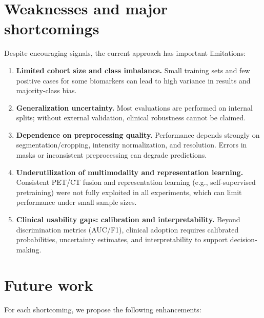 \documentclass[twoside,runningheads,a4paper,11pt]{report}
\begin{document}
\section{Weaknesses and major shortcomings}
Despite encouraging signals, the current approach has important limitations:

\begin{enumerate}
    \item \textbf{Limited cohort size and class imbalance.}
    Small training sets and few positive cases for some biomarkers can lead to high variance in results and majority-class bias.
    
    \item \textbf{Generalization uncertainty.}
    Most evaluations are performed on internal splits; without external validation, clinical robustness cannot be claimed.
    
    \item \textbf{Dependence on preprocessing quality.}
    Performance depends strongly on segmentation/cropping, intensity normalization, and resolution. Errors in masks or inconsistent preprocessing can degrade predictions.
    
    \item \textbf{Underutilization of multimodality and representation learning.}
    Consistent PET/CT fusion and representation learning (e.g., self-supervised pretraining) were not fully exploited in all experiments, which can limit performance under small sample sizes.
    
    \item \textbf{Clinical usability gaps: calibration and interpretability.}
    Beyond discrimination metrics (AUC/F1), clinical adoption requires calibrated probabilities, uncertainty estimates, and interpretability to support decision-making.
\end{enumerate}

\section{Future work}
For each shortcoming, we propose the following enhancements:
\end{document}
